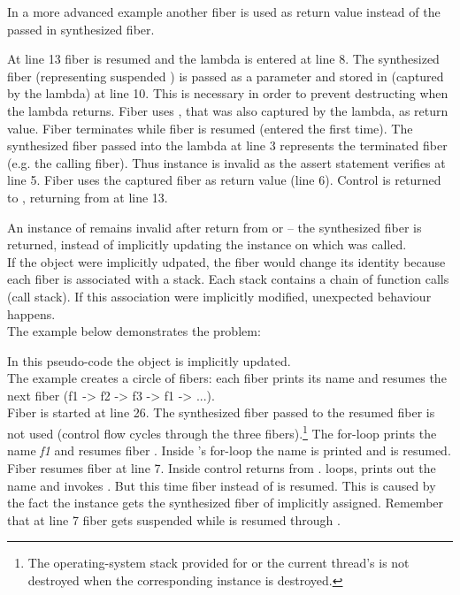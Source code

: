 In a more advanced example another fiber is used as return value instead of the
passed in synthesized fiber.

At line 13 fiber  is resumed and the lambda is entered at line 8. The
synthesized fiber  (representing suspended \main) is passed as a
parameter  and stored in  (captured by the lambda) at line 10.
This is necessary in order to prevent destructing  when the lambda
returns. Fiber  uses , that was also captured by the lambda, as
return value. Fiber  terminates while fiber  is resumed (entered
the first time). The synthesized fiber  passed into the lambda at line 3
represents the terminated fiber  (e.g. the calling fiber). Thus instance
 is invalid as the assert statement verifies at line 5. Fiber  uses
the captured fiber  as return value (line 6). Control is returned to
\main, returning from  at line 13.\\


\label{fiberreturn}
An instance of \fiber remains invalid after return from \resume or \resumewith --
the synthesized fiber is returned, instead of implicitly updating the \fiber
instance on which \resume was called.\\
If the \fiber object were implicitly udpated, the fiber would 
change its identity because each fiber is associated with a stack. Each stack
contains a chain of function calls (call stack). If this association were
implicitly modified, unexpected behaviour happens.\\
The example below demonstrates the problem:

In this pseudo-code the \fiber object is implicitly updated.\\
The example creates a circle of fibers: each fiber prints its name and resumes
the next fiber (f1 -> f2 -> f3 -> f1 -> ...).\\
Fiber  is started at line 26. The synthesized fiber  passed 
to the resumed fiber is not used (control flow cycles through the three
fibers).\footnote{The operating-system stack provided for \main or the current
thread's \entryfn\xspace is not destroyed when the corresponding \fiber instance is
destroyed.}
The for-loop prints the name \emph{f1} and resumes fiber . Inside 
's for-loop the name is printed and  is resumed. Fiber 
resumes fiber  at line 7. Inside  control returns from
.  loops, prints out the name and invokes . But
this time fiber  instead of  is resumed. This is caused by the
fact the instance  gets the synthesized fiber of  implicitly
assigned. Remember that at line 7 fiber  gets suspended while 
is resumed through .\\

